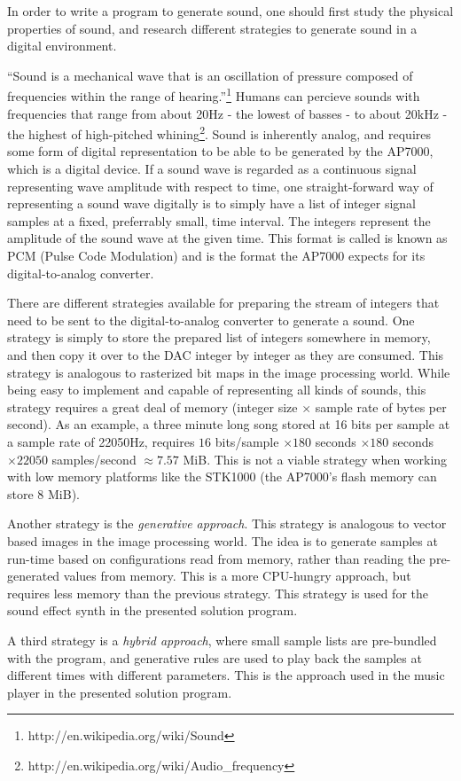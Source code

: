 In order to write a program to generate sound, one should first study the physical properties of sound, and research different strategies to generate sound in a digital environment.

``Sound is a mechanical wave that is an oscillation of pressure composed of frequencies within the range of hearing.''\footnote{http://en.wikipedia.org/wiki/Sound} Humans can percieve sounds with frequencies that range from about 20Hz - the lowest of basses - to about 20kHz - the highest of high-pitched whining\footnote{http://en.wikipedia.org/wiki/Audio_frequency}.
Sound is inherently analog, and requires some form of digital representation to be able to be generated by the AP7000, which is a digital device.
If a sound wave is regarded as a continuous signal representing wave amplitude with respect to time, one straight-forward way of representing a sound wave digitally is to simply have a list of integer signal samples at a fixed, preferrably small, time interval.
The integers represent the amplitude of the sound wave at the given time.
This format is called is known as PCM (Pulse Code Modulation) and is the format the AP7000 expects for its digital-to-analog converter.

There are different strategies available for preparing the stream of integers that need to be sent to the digital-to-analog converter to generate a sound.
One strategy is simply to store the prepared list of integers somewhere in memory, and then copy it over to the DAC integer by integer as they are consumed.
This strategy is analogous to rasterized bit maps in the image processing world.
While being easy to implement and capable of representing all kinds of sounds, this strategy requires a great deal of memory (integer size $\times$ sample rate of bytes per second).
As an example, a three minute long song stored at 16 bits per sample at a sample rate of 22050Hz, requires $16$ bits/sample $\times 180$ seconds $\times 180$ seconds $\times 22050$ samples/second $\approx 7.57$ MiB.
This is not a viable strategy when working with low memory platforms like the STK1000 (the AP7000's flash memory can store 8 MiB).

Another strategy is the \emph{generative approach}.
This strategy is analogous to vector based images in the image processing world.
The idea is to generate samples at run-time based on configurations read from memory, rather than reading the pre-generated values from memory.
This is a more CPU-hungry approach, but requires less memory than the previous strategy.
This strategy is used for the sound effect synth in the presented solution program.

A third strategy is a \emph{hybrid approach}, where small sample lists are pre-bundled with the program, and generative rules are used to play back the samples at different times with different parameters.
This is the approach used in the music player in the presented solution program.
